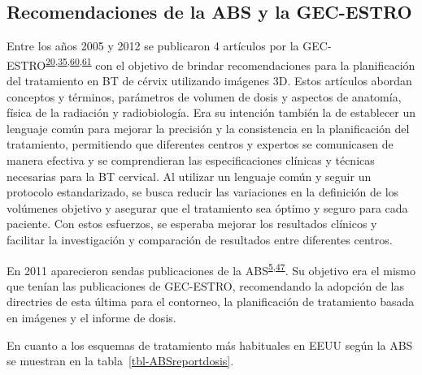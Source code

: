 \documentclass[
  a4paper,
]{scrreprt}
\begin{document}
\hypertarget{recomendaciones-de-la-abs-y-la-gec-estro}{%
\subsection{Recomendaciones de la ABS y la
GEC-ESTRO}\label{recomendaciones-de-la-abs-y-la-gec-estro}}

Entre los años 2005 y 2012 se publicaron 4 artículos por la
GEC-ESTRO\textsuperscript{\protect\hyperlink{ref-haie-meder2005}{20},\protect\hyperlink{ref-dimopoulos2012}{35},\protect\hyperlink{ref-potter2006}{60},\protect\hyperlink{ref-hellebust2010}{61}}
con el objetivo de brindar recomendaciones para la planificación del
tratamiento en BT de cérvix utilizando imágenes 3D. Estos artículos
abordan conceptos y términos, parámetros de volumen de dosis y aspectos
de anatomía, física de la radiación y radiobiología. Era su intención
también la de establecer un lenguaje común para mejorar la precisión y
la consistencia en la planificación del tratamiento, permitiendo que
diferentes centros y expertos se comunicasen de manera efectiva y se
comprendieran las especificaciones clínicas y técnicas necesarias para
la BT cervical. Al utilizar un lenguaje común y seguir un protocolo
estandarizado, se busca reducir las variaciones en la definición de los
volúmenes objetivo y asegurar que el tratamiento sea óptimo y seguro
para cada paciente. Con estos esfuerzos, se esperaba mejorar los
resultados clínicos y facilitar la investigación y comparación de
resultados entre diferentes centros.

En 2011 aparecieron sendas publicaciones de la
ABS\textsuperscript{\protect\hyperlink{ref-viswanathan2012a}{5},\protect\hyperlink{ref-viswanathan2012}{47}}.
Su objetivo era el mismo que tenían las publicaciones de GEC-ESTRO,
recomendando la adopción de las directries de esta última para el
contorneo, la planificación de tratamiento basada en imágenes y el
informe de dosis.

En cuanto a los esquemas de tratamiento más habituales en EEUU según la
ABS se muestran en la tabla~\ref{tbl-ABSreportdosis}.
\end{document}
